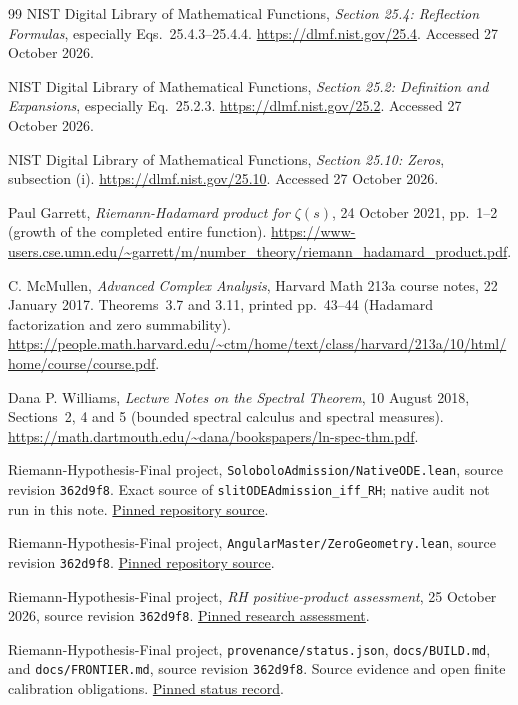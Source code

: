 \documentclass[11pt,a4paper]{article}
\numberwithin{equation}{section}
\theoremstyle{definition}
\theoremstyle{remark}
\begin{document}
\begin{thebibliography}{99}
\small
{}
NIST Digital Library of Mathematical Functions,
\emph{Section 25.4: Reflection Formulas}, especially Eqs.~25.4.3--25.4.4.
\url{https://dlmf.nist.gov/25.4}. Accessed 27 October 2026.

NIST Digital Library of Mathematical Functions,
\emph{Section 25.2: Definition and Expansions}, especially Eq.~25.2.3.
\url{https://dlmf.nist.gov/25.2}. Accessed 27 October 2026.

NIST Digital Library of Mathematical Functions,
\emph{Section 25.10: Zeros}, subsection (i).
\url{https://dlmf.nist.gov/25.10}. Accessed 27 October 2026.

Paul Garrett, \emph{Riemann-Hadamard product for $\zeta(s)$},
24 October 2021, pp.~1--2 (growth of the completed entire function).
\url{https://www-users.cse.umn.edu/~garrett/m/number_theory/riemann_hadamard_product.pdf}.

C. McMullen, \emph{Advanced Complex Analysis}, Harvard Math 213a
course notes, 22 January 2017. Theorems~3.7 and 3.11,
printed pp.~43--44 (Hadamard factorization and zero summability).
\url{https://people.math.harvard.edu/~ctm/home/text/class/harvard/213a/10/html/home/course/course.pdf}.

Dana P. Williams, \emph{Lecture Notes on the Spectral Theorem},
10 August 2018, Sections~2, 4 and 5 (bounded spectral calculus and
spectral measures).
\url{https://math.dartmouth.edu/~dana/bookspapers/ln-spec-thm.pdf}.

Riemann-Hypothesis-Final project, \texttt{SoloboloAdmission/NativeODE.lean},
source revision \texttt{362d9f8}. Exact source of
\texttt{slitODEAdmission\_iff\_RH}; native audit not run in this note.
\href{https://github.com/randogelist/Riemann-Hypothesis-Final/blob/362d9f8aeaaf9479cc27ceb6b63bdb7456267990/SoloboloAdmission/NativeODE.lean}{Pinned repository source}.

Riemann-Hypothesis-Final project, \texttt{AngularMaster/ZeroGeometry.lean},
source revision \texttt{362d9f8}.
\href{https://github.com/randogelist/Riemann-Hypothesis-Final/blob/362d9f8aeaaf9479cc27ceb6b63bdb7456267990/AngularMaster/ZeroGeometry.lean}{Pinned repository source}.

Riemann-Hypothesis-Final project,
\emph{RH positive-product assessment}, 25 October 2026,
source revision \texttt{362d9f8}.
\href{https://github.com/randogelist/Riemann-Hypothesis-Final/blob/362d9f8aeaaf9479cc27ceb6b63bdb7456267990/docs/research/2026-10-25/rh-positive-product-assessment.md}{Pinned research assessment}.

Riemann-Hypothesis-Final project, \texttt{provenance/status.json},
\texttt{docs/BUILD.md}, and \texttt{docs/FRONTIER.md},
source revision \texttt{362d9f8}. Source evidence and open finite
calibration obligations.
\href{https://github.com/randogelist/Riemann-Hypothesis-Final/blob/362d9f8aeaaf9479cc27ceb6b63bdb7456267990/provenance/status.json}{Pinned status record}.
\end{thebibliography}
\end{document}
